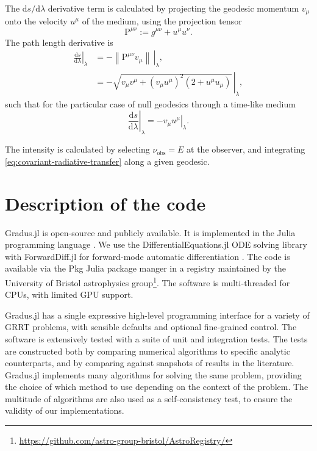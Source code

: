 \documentclass[fleqn,usenatbib]{mnras}
\newcommand{\Gradus}{{\sc Gradus.jl}\xspace}
\newcommand{\software}[1]{{\sc #1}}
\renewcommand{\d}{\text{d}}
\begin{document}
The $\d s / \d \lambda$ derivative term is calculated by projecting the geodesic
momentum $v_\mu$ onto the velocity $u^\mu$ of the medium, using the projection
tensor
\begin{equation}
    \mathrm{P}^{\mu\nu} := g^{\mu\nu} + u^\mu u^\nu.
\end{equation}
The path length derivative is
\begin{align}
    \left. \frac{\d s}{\d \lambda} \right\rvert_\lambda
    &= - \left. \left\lVert \mathrm{P}^{\mu\nu} v_\mu\right\rVert\, \right\rvert_\lambda,\\
    &= - \left. \sqrt{v_\mu v^\mu + \left(v_\mu u^\mu\right)^2 \left(2 + u^\mu u_\mu\right)} \, \right\rvert_\lambda,
\end{align}
such that for the particular case of null geodesics through a time-like medium
\begin{equation}
    \left. \frac{\d s}{\d \lambda} \right\rvert_\lambda = - \left. v_\mu u^\mu \right\rvert_\lambda.
\end{equation}

The intensity is calculated by selecting $\nu_\text{obs} = E$ at the observer,
and integrating \eqref{eq:covariant-radiative-transfer} along a given geodesic.

\section{Description of the code}
\label{sec:description-of-code}

\Gradus is open-source and publicly available. It is implemented in the Julia
programming language \citep{Bezanson_Julia_A_fresh_2017}. We use the
DifferentialEquations.jl ODE solving library with ForwardDiff.jl for
forward-mode automatic differentiation \citep{RevelsLubinPapamarkou2016}. The
code is available via the \software{Pkg} Julia package manger in a registry
maintained by the University of Bristol astrophysics
group\footnote{\url{https://github.com/astro-group-bristol/AstroRegistry/}}. The
software is multi-threaded for CPUs, with limited GPU support.

\Gradus has a single expressive high-level programming interface for a variety
of GRRT problems, with sensible defaults and optional fine-grained control. The
software is extensively tested with a suite of unit and integration tests. The
tests are constructed both by comparing numerical algorithms to specific
analytic counterparts, and by comparing against snapshots of results in the
literature. \Gradus implements many algorithms for solving the same problem,
providing the choice of which method to use depending on the context of the
problem. The multitude of algorithms are also used as a self-consistency test,
to ensure the validity of our implementations.
\end{document}
